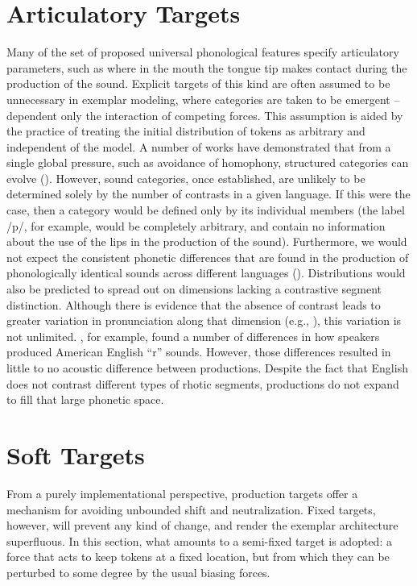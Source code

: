 \section{Articulatory Targets}

Many of the set of proposed universal phonological features specify
articulatory parameters, such as where in the mouth the tongue tip
makes contact during the production of the sound. Explicit targets
of this kind are often assumed to be unnecessary in exemplar modeling,
where categories are taken to be emergent – dependent only the interaction
of competing forces. This assumption is aided by the practice of treating
the initial distribution of tokens as arbitrary and independent of
the model. A number of works have demonstrated that from a single
global pressure, such as avoidance of homophony, structured categories
can evolve (\citealt{Boer2000,Wedel2006,soskuthy2013phonetic}). However,
sound categories, once established, are unlikely to be determined
solely by the number of contrasts in a given language. If this were
the case, then a category would be defined only by its individual
members (the label {/p/}, for example, would be completely
arbitrary, and contain no information about the use of the lips in
the production of the sound). Furthermore, we would not expect the
consistent phonetic differences that are found in the production of
phonologically identical sounds across different languages (\citealt{Keating1985}).
Distributions would also be predicted to spread out on dimensions
lacking a contrastive segment distinction. Although there is evidence
that the absence of contrast leads to greater variation in pronunciation
along that dimension (e.g., \citealt{choi1995acoustic}), this variation
is not unlimited. \citet{Baker2011}, for example, found a number
of differences in how speakers produced American English “r”
sounds. However, those differences resulted in little to no acoustic
difference between productions. Despite the fact that English does
not contrast different types of rhotic segments, productions do not
expand to fill that large phonetic space. 

\section{\label{subsec:Soft-Targets}Soft Targets}

From a purely implementational perspective, production targets offer
a mechanism for avoiding unbounded shift and neutralization. Fixed
targets, however, will prevent any kind of change, and render the
exemplar architecture superfluous. In this section, what amounts to
a semi-fixed target is adopted: a force that acts to keep tokens at
a fixed location, but from which they can be perturbed to some degree
by the usual biasing forces. 

